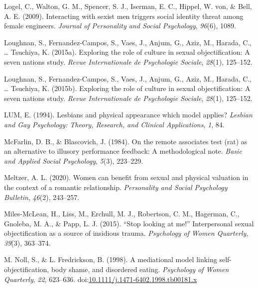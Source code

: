 \documentclass[
  man]{apa6}
\begin{document}
\leavevmode\hypertarget{ref-logel2009interacting}{}%
Logel, C., Walton, G. M., Spencer, S. J., Iserman, E. C., Hippel, W. von, \& Bell, A. E. (2009). Interacting with sexist men triggers social identity threat among female engineers. \emph{Journal of Personality and Social Psychology}, \emph{96}(6), 1089.

\leavevmode\hypertarget{ref-loughnan2015exploring}{}%
Loughnan, S., Fernandez-Campos, S., Vaes, J., Anjum, G., Aziz, M., Harada, C., \ldots{} Tsuchiya, K. (2015a). Exploring the role of culture in sexual objectification: A seven nations study. \emph{Revue Internationale de Psychologie Sociale}, \emph{28}(1), 125--152.

\leavevmode\hypertarget{ref-loughnan2015}{}%
Loughnan, S., Fernandez-Campos, S., Vaes, J., Anjum, G., Aziz, M., Harada, C., \ldots{} Tsuchiya, K. (2015b). Exploring the role of culture in sexual objectification: A seven nations study. \emph{Revue Internationale de Psychologie Sociale}, \emph{28}(1), 125--152.

\leavevmode\hypertarget{ref-lum1994lesbians}{}%
LUM, E. (1994). Lesbians and physical appearance which model applies? \emph{Lesbian and Gay Psychology: Theory, Research, and Clinical Applications}, \emph{1}, 84.

\leavevmode\hypertarget{ref-mcfarlin1984remote}{}%
McFarlin, D. B., \& Blascovich, J. (1984). On the remote associates test (rat) as an alternative to illusory performance feedback: A methodological note. \emph{Basic and Applied Social Psychology}, \emph{5}(3), 223--229.

\leavevmode\hypertarget{ref-meltzer2020women}{}%
Meltzer, A. L. (2020). Women can benefit from sexual and physical valuation in the context of a romantic relationship. \emph{Personality and Social Psychology Bulletin}, \emph{46}(2), 243--257.

\leavevmode\hypertarget{ref-miles2015stop}{}%
Miles-McLean, H., Liss, M., Erchull, M. J., Robertson, C. M., Hagerman, C., Gnoleba, M. A., \& Papp, L. J. (2015). ``Stop looking at me!'' Interpersonal sexual objectification as a source of insidious trauma. \emph{Psychology of Women Quarterly}, \emph{39}(3), 363--374.

\leavevmode\hypertarget{ref-nollfredrickson1998}{}%
M. Noll, S., \& L. Fredrickson, B. (1998). A mediational model linking self-objectification, body shame, and disordered eating. \emph{Psychology of Women Quarterly}, \emph{22}, 623--636. doi:\href{https://doi.org/10.1111/j.1471-6402.1998.tb00181.x}{10.1111/j.1471-6402.1998.tb00181.x}
\end{document}
